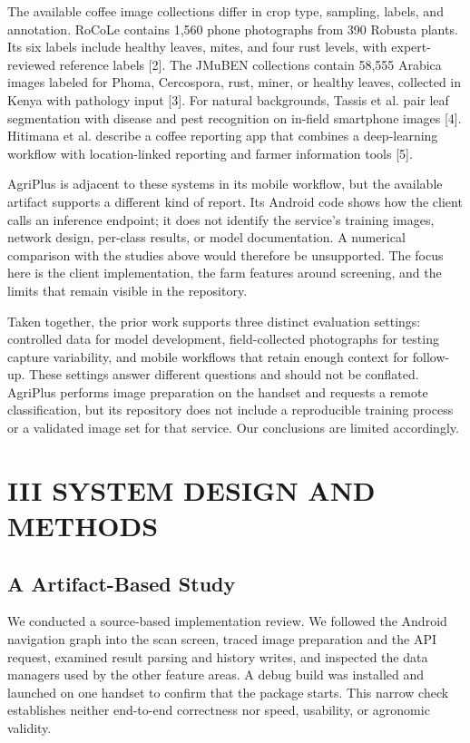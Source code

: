 \documentclass[conference]{IEEEtran}
\begin{document}
The available coffee image collections differ in crop type, sampling, labels, and annotation. RoCoLe contains 1,560 phone photographs from 390 Robusta plants. Its six labels include healthy leaves, mites, and four rust levels, with expert-reviewed reference labels [2]. The JMuBEN collections contain 58,555 Arabica images labeled for Phoma, Cercospora, rust, miner, or healthy leaves, collected in Kenya with pathology input [3]. For natural backgrounds, Tassis et al. pair leaf segmentation with disease and pest recognition on in-field smartphone images [4]. Hitimana et al. describe a coffee reporting app that combines a deep-learning workflow with location-linked reporting and farmer information tools [5].

AgriPlus is adjacent to these systems in its mobile workflow, but the available artifact supports a different kind of report. Its Android code shows how the client calls an inference endpoint; it does not identify the service's training images, network design, per-class results, or model documentation. A numerical comparison with the studies above would therefore be unsupported. The focus here is the client implementation, the farm features around screening, and the limits that remain visible in the repository.

Taken together, the prior work supports three distinct evaluation settings: controlled data for model development, field-collected photographs for testing capture variability, and mobile workflows that retain enough context for follow-up. These settings answer different questions and should not be conflated. AgriPlus performs image preparation on the handset and requests a remote classification, but its repository does not include a reproducible training process or a validated image set for that service. Our conclusions are limited accordingly.

\section*{III SYSTEM DESIGN AND METHODS}

\subsection*{A Artifact-Based Study}

We conducted a source-based implementation review. We followed the Android navigation graph into the scan screen, traced image preparation and the API request, examined result parsing and history writes, and inspected the data managers used by the other feature areas. A debug build was installed and launched on one handset to confirm that the package starts. This narrow check establishes neither end-to-end correctness nor speed, usability, or agronomic validity.
\end{document}
